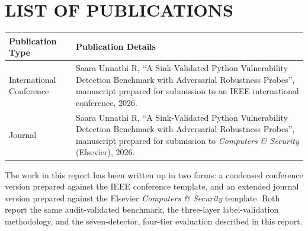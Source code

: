 \chapter*{LIST OF PUBLICATIONS}

\begin{table}[h!]
\centering
\begin{tabular}{|p{4cm}|p{10cm}|}
\hline
\textbf{Publication Type} & \textbf{Publication Details} \\
\hline
International Conference & Saara Unnathi R, ``A Sink-Validated Python
Vulnerability Detection Benchmark with Adversarial Robustness Probes'',
manuscript prepared for submission to an IEEE international conference, 2026.
\\
\hline
Journal & Saara Unnathi R, ``A Sink-Validated Python Vulnerability Detection
Benchmark with Adversarial Robustness Probes'', manuscript prepared for
submission to \textit{Computers \& Security} (Elsevier), 2026. \\
\hline
\end{tabular}
\end{table}

\vspace{0.5cm}
\noindent The work in this report has been written up in two forms: a condensed
conference version prepared against the IEEE conference template, and an extended
journal version prepared against the Elsevier \textit{Computers \& Security}
template. Both report the same audit-validated benchmark, the three-layer
label-validation methodology, and the seven-detector, four-tier evaluation
described in this report.